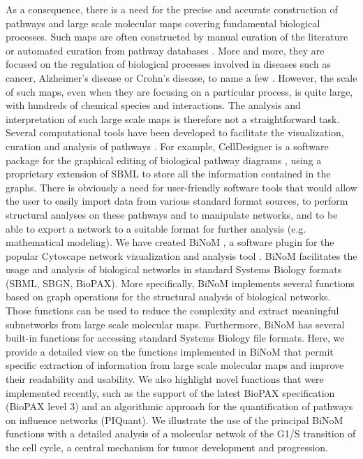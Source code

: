 \documentclass[10pt]{bmc_article}
\newenvironment{bmcformat}{\baselineskip20pt\sloppy\setboolean{publ}{false}}{\baselineskip20pt\sloppy}
\begin{document}
\begin{bmcformat}
As a consequence, there is a need for the precise and accurate construction of
pathways and large scale molecular maps covering fundamental biological
processes. Such maps are often constructed by manual curation of the literature or
automated curation from pathway databases \cite{bauer2009pathway}. More and more, they
are focused on the regulation of biological processes involved in diseases such
as cancer, Alzheimer's disease or Crohn's disease, to name a few \cite{oda2005comprehensive, oda2006comprehensive,
calzone2008comprehensive, caron2010comprehensive}. However, the scale of such
maps, even when they are focusing on a particular process, is quite large, with
hundreds of chemical species and interactions. The analysis and interpretation of such
large scale maps is therefore not a straightforward task. Several computational
tools have been developed to facilitate the visualization, curation and analysis
of pathways \cite{adriaens2008public}. For example, CellDesigner is a software package
for the graphical editing of biological pathway diagrams
\cite{funahashi2003celldesigner}, using a proprietary extension
of SBML to store all the information contained in the graphs. There is obviously
a need for user-friendly software tools that would allow the user to easily
import data from various standard format sources, to perform structural analyses on these pathways
and to manipulate networks, and to be able to export a network to a suitable
format for further analysis (e.g. mathematical modeling). We have created
BiNoM \cite{zinovyev2008binom}, a software plugin for the popular Cytoscape
network vizualization and analysis tool \cite{cline2007integration}. BiNoM
facilitates the usage and analysis of biological networks in standard Systems
Biology formats (SBML, SBGN, BioPAX). More specifically, BiNoM implements
several functions based on graph operations for the structural analysis of
biological networks. Those functions can be used to reduce the complexity and
extract meaningful subnetworks from large scale molecular maps. Furthermore,
BiNoM has several built-in functions for accessing standard Systems Biology file
formats. Here, we provide a detailed view on the functions implemented in BiNoM
that permit specific extraction of information from large scale molecular maps
and improve their readability and usability. We also highlight novel functions
that were implemented recently, such as the support of the latest BioPAX
specification (BioPAX level 3) and an algorithmic approach for the
quantification of pathways on influence networks (PIQuant). We illustrate the
use of the principal BiNoM functions with a detailed analysis of a molecular
netwok of the G1/S transition of the cell cycle, a central mechanism
for tumor development and progression.


\end{bmcformat}
\end{document}
